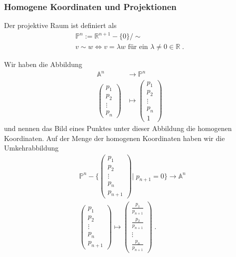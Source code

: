 \subsubsection{Homogene Koordinaten und Projektionen}
\label{subsub:math:affine-space:homog-coords-projection}
\begin{Definition}
Der projektive  Raum ist definiert als
\begin{align*}
\mathbb{P}^n := \mathbb{R}^{n+1} - \{ 0\} / \sim \\
v \sim w \Leftrightarrow v = \lambda w \text{ für ein } \lambda \neq 0 \in \mathbb{R} \; . 
\end{align*}
\end{Definition}

Wir haben die Abbildung
\begin{align*}
\mathbb{A}^n & \to \mathbb{P}^n \\
\begin{pmatrix} p_1 \\ p_2 \\ \vdots \\ p_n \end{pmatrix} & \mapsto \begin{pmatrix} p_1 \\ p_2 \\ \vdots \\ p_n  \\  1\end{pmatrix} 
\end{align*}
und nennen das Bild eines Punktes unter dieser Abbildung die homogenen Koordinaten.
Auf der Menge der homogenen Koordinaten haben wir die Umkehrabbildung
\begin{align*}
& \mathbb{P}^n - \Biggl \{ \begin{pmatrix} p_1 \\ p_2 \\ \vdots \\ p_n  \\  p_{n+1} \end{pmatrix} \Bigg | \; p_{n+1} = 0 \Biggr \}   \to \mathbb{A}^n \\
& \begin{pmatrix} p_1 \\ p_2 \\ \vdots \\ p_n  \\  p_{n+1} \end{pmatrix}   \mapsto \begin{pmatrix}  \frac{p_1}{ p_{n+1}} \\ \frac{p_2}{ p_{n+1}}  \\ \vdots \\ \frac{p_n}{ p_{n+1}}  \end{pmatrix}  \; .
\end{align*}


